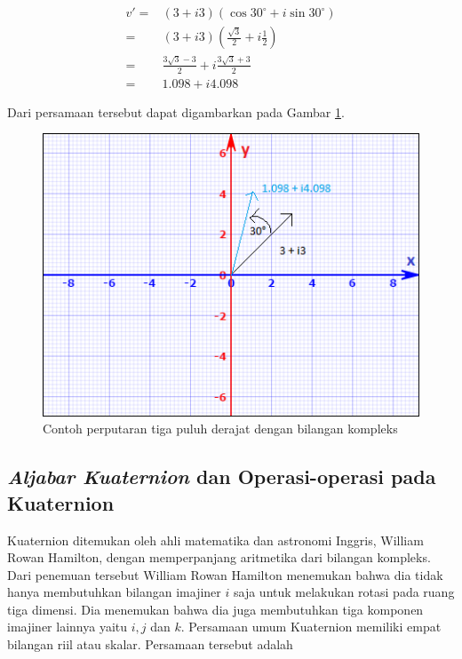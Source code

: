 \begin{equation}
	\begin{split}
		v' = &(3 + i3)(\cos 30^{\circ} + i \sin 30^{\circ})\\
		= & (3 + i3)(\frac{\sqrt{3}}{2} + i \frac{1}{2})\\
		= & \frac{3\sqrt{3}-3}{2} + i\frac{3\sqrt{3}+3}{2}\\
		= & 1.098 + i4.098
	\end{split}
\label{eq:rotasi_kompleks_tiga_puluh_derajat}
\end{equation}

Dari persamaan tersebut dapat digambarkan pada Gambar \ref{fig:diagram-rotasi-kompleks1}.

\begin{figure}[htbp]
\centering
\includegraphics[scale=1]{Gambar/diagram-rotasi-kompleks1.PNG}
\caption{Contoh perputaran tiga puluh derajat dengan bilangan kompleks} 
\label{fig:diagram-rotasi-kompleks1}
\end{figure}
\subsection{\textit{Aljabar Kuaternion} dan Operasi-operasi pada Kuaternion}

Kuaternion ditemukan oleh ahli matematika dan astronomi Inggris, William Rowan Hamilton, dengan memperpanjang aritmetika dari bilangan kompleks. Dari penemuan tersebut William Rowan Hamilton menemukan bahwa dia tidak hanya membutuhkan bilangan imajiner \(i\) saja untuk melakukan rotasi pada ruang tiga dimensi. Dia menemukan bahwa dia juga membutuhkan tiga komponen imajiner lainnya yaitu \(i,j\) dan \(k\). Persamaan umum Kuaternion memiliki empat bilangan riil atau skalar. Persamaan tersebut adalah 

